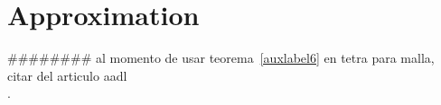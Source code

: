 \chapter{Approximation}\label{auxLabel100}

{\color{blue}\#\#\#\#\#\#\#\# al momento de usar
teorema~\ref{auxlabel6}  en   tetra para
malla, citar del articulo aadl\\.}






